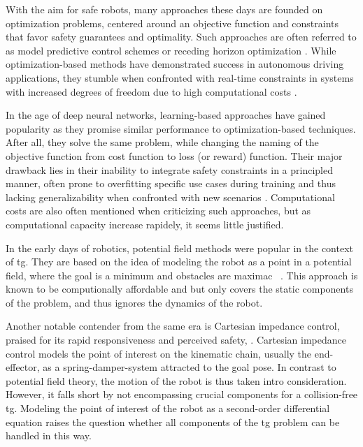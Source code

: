 With the aim for safe robots, many approaches these days are
founded on optimization problems, centered around an
objective function and constraints that favor safety
guarantees and optimality. Such approaches are often
referred to as model predictive control schemes or receding
horizon optimization \cite{hewing2020learning}. While
optimization-based methods have demonstrated success in
autonomous driving applications, they stumble when
confronted with real-time constraints in systems with
increased degrees of freedom due to high computational costs
\cite{spahn2021coupled}.

In the age of deep neural networks, learning-based
approaches have gained popularity as they promise similar
performance to optimization-based techniques. After all,
they solve the same problem, while changing the naming of
the objective function from cost function to loss (or
reward) function. Their major drawback lies in their
inability to integrate safety constraints in a principled
manner, often prone to overfitting specific use cases during
training and thus lacking generalizability when confronted
with new scenarios \cite{noroozi2023conventional}.
Computational costs are also often
mentioned when criticizing such approaches, but as
computational capacity increase rapidely, it seems little
justified. 

In the early days of robotics, potential field methods were
popular in the context of \ac{tg}.
They are based on the idea of modeling the robot as
a point in a potential field, where the goal is a minimum
and obstacles are maximac
~\cite{barraquand1992numerical,hwang1992potential}. This
approach is known to be computionally affordable and but
only covers the static components of the problem, and thus
ignores the dynamics of the robot.

Another notable contender from the same era is Cartesian
impedance control, praised for its rapid responsiveness and
perceived safety, \cite{hogan1985impedance}. Cartesian
impedance control models the point of interest on the
kinematic chain, usually the end-effector, as a
spring-damper-system attracted to the goal pose. In contrast
to potential field theory, the motion of the robot is thus
taken intro consideration. However, it falls short by not
encompassing crucial components for a collision-free
\ac{tg}. Modeling the point of interest of the robot as a
second-order differential equation raises the question
whether all components of the \ac{tg} problem can be handled
in this way. 

